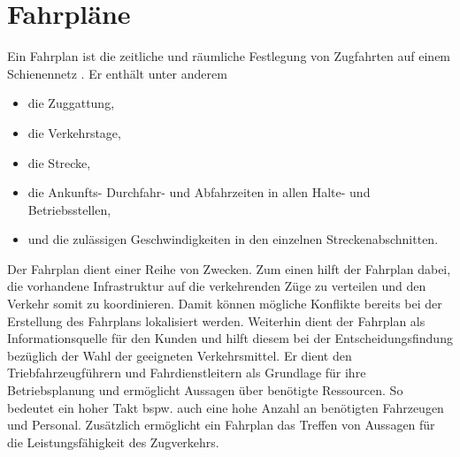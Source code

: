 \section{Fahrpläne}

Ein Fahrplan ist die zeitliche und räumliche Festlegung von Zugfahrten auf einem Schienennetz \cite{groger_simulation_2002}. Er enthält unter anderem
\begin{itemize}
    \item die Zuggattung,
    \item die Verkehrstage,
    \item die Strecke,
    \item die Ankunfts- Durchfahr- und Abfahrzeiten in allen Halte- und Betriebsstellen,
    \item und die zulässigen Geschwindigkeiten in den einzelnen Streckenabschnitten.
\end{itemize}
Der Fahrplan dient einer Reihe von Zwecken. Zum einen hilft der Fahrplan dabei, die vorhandene Infrastruktur auf die verkehrenden Züge zu verteilen und den Verkehr somit zu koordinieren. Damit können mögliche Konflikte bereits bei der Erstellung des Fahrplans lokalisiert werden. Weiterhin dient der Fahrplan als Informationsquelle für den Kunden und hilft diesem bei der Entscheidungsfindung bezüglich der Wahl der geeigneten Verkehrsmittel. Er dient den Triebfahrzeugführern und Fahrdienstleitern als Grundlage für ihre Betriebsplanung und ermöglicht Aussagen über benötigte Ressourcen. So bedeutet ein hoher Takt bspw. auch eine hohe Anzahl an benötigten Fahrzeugen und Personal. Zusätzlich ermöglicht ein Fahrplan das Treffen von Aussagen für die Leistungsfähigkeit des Zugverkehrs. \cite{groger_simulation_2002}
